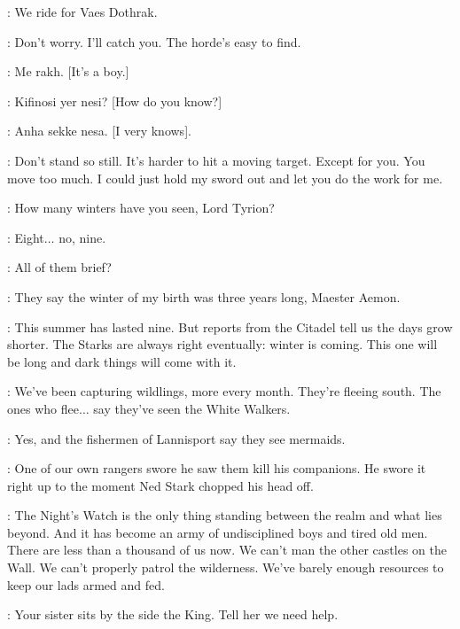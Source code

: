 \RAKHARO: We ride for Vaes Dothrak. 

\JORAH: Don't worry. I'll catch you. The horde's easy to find. 


\scene



\DAENERYS: Me rakh. [It's a boy.] 

\DROGO: Kifinosi yer nesi? [How do you know?] 

\DAENERYS: Anha sekke nesa. [I very knows].


\scene



\JON: Don't stand so still. It's harder to hit a moving target.  Except for you. You move too much. I could just hold my sword out and let you do the work for me. 

\AEMON: How many winters have you seen, Lord Tyrion? 

\TYRION: Eight$\ldots$ no, nine. 

\AEMON: All of them brief? 

\TYRION: They say the winter of my birth was three years long, Maester Aemon. 

\AEMON: This summer has lasted nine. But reports from the Citadel tell us the days grow shorter. The Starks are always right eventually: winter is coming. This one will be long and dark things will come with it. 

\JEOR: We've been capturing wildlings, more every month. They're fleeing south. The ones who flee$\ldots$ say they've seen the White Walkers. 

\TYRION: Yes, and the fishermen of Lannisport say they see mermaids. 

\JEOR: One of our own rangers swore he saw them kill his companions. He swore it right up to the moment Ned Stark chopped his head off. 

\AEMON: The Night's Watch is the only thing standing between the realm and what lies beyond. And it has become an army of undisciplined boys and tired old men. There are less than a thousand of us now. We can't man the other castles on the Wall. We can't properly patrol the wilderness. We've barely enough resources to keep our lads armed and fed. 

\JEOR: Your sister sits by the side the King. Tell her we need help. 

